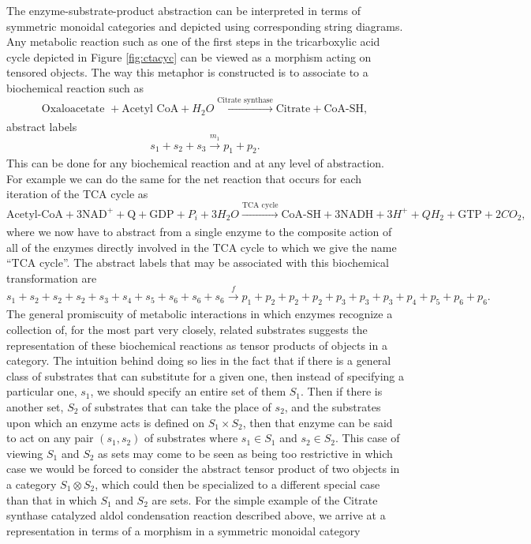 The enzyme-substrate-product abstraction can be interpreted in terms of symmetric monoidal categories and depicted using corresponding string diagrams. Any metabolic reaction such as one of the first steps in the tricarboxylic acid cycle depicted in Figure \ref{fig:ctacyc} can be viewed as a morphism acting on tensored objects. The way this metaphor is constructed is to associate to a biochemical reaction such as 
$$
\text{Oxaloacetate } + \text{Acetyl CoA} + H_2O \xrightarrow[]{\text{Citrate synthase}} \text{Citrate} + \text{CoA-SH},
$$
abstract labels
$$
s_1 + s_2 + s_3 \xrightarrow[]{m_1} p_1 + p_2.
$$
This can be done for any biochemical reaction and at any level of abstraction. For example we can do the same for the net reaction that occurs for each iteration of the TCA cycle as
$$
\text{Acetyl-CoA} + 3 \text{NAD}^+ + \text{Q} + \text{GDP} + P_i + 3 H_2O \xrightarrow[]{\text{TCA cycle}} \text{CoA-SH} + 3 \text{NADH} + 3H^+ + QH_2 + \text{GTP} + 2 CO_2,
$$
where we now have to abstract from a single enzyme to the composite action of all of the enzymes directly involved in the TCA cycle to which we give the name ``TCA cycle''. The abstract labels that may be associated with this biochemical transformation are
$$
s_1 + s_2 + s_2 + s_2 + s_3 + s_4 + s_5 + s_6 + s_6 + s_6 \xrightarrow[]{f} p_1 + p_2 + p_2 + p_2 + p_3 + p_3  + p_3 + p_4 + p_5 + p_6 + p_6. 
$$
The general promiscuity of metabolic interactions in which enzymes recognize a collection of, for the most part very closely, related substrates suggests the representation of these biochemical reactions as tensor products of objects in a category. The intuition behind doing so lies in the fact that if there is a general class of substrates that can substitute for a given one, then instead of specifying a particular one, $s_1$, we should specify an entire set of them $S_1$. Then if there is another set, $S_2$ of substrates that can take the place of $s_2$, and the substrates upon which an enzyme acts is defined on $S_1 \times S_2$, then that enzyme can be said to act on any pair $(s_1,s_2)$ of substrates where $s_1 \in S_1$ and $s_2 \in S_2$. This case of viewing $S_1$ and $S_2$ as sets may come to be seen as being too restrictive in which case we would be forced to consider the abstract tensor product of two objects in a category $S_1 \otimes S_2$, which could then be specialized to a different special case than that in which $S_1$ and $S_2$ are sets. For the simple example of the Citrate synthase catalyzed aldol condensation reaction described above, we arrive at a representation in terms of a morphism in a symmetric monoidal category

